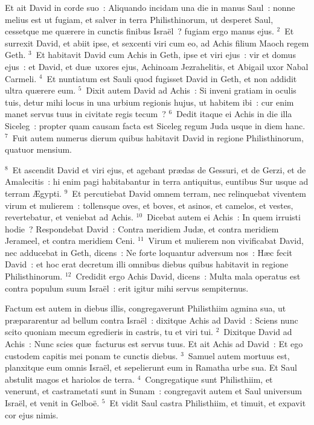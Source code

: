 \lettrine[lines=10,image=true,loversize=0.05,lraise=-0.03]{E}{}t ait David in corde suo~: Aliquando incidam una die in manus Saul~: nonne melius est ut fugiam, et salver in terra Philisthinorum, ut desperet Saul, cessetque me qu\ae rere in cunctis finibus Isra\"el~? fugiam ergo manus ejus.
${}^{2}$~Et surrexit David, et abiit ipse, et sexcenti viri cum eo, ad Achis filium Maoch regem Geth.
${}^{3}$~Et habitavit David cum Achis in Geth, ipse et viri ejus~: vir et domus ejus~: et David, et du\ae\ uxores ejus, Achinoam Jezrahelitis, et Abigail uxor Nabal Carmeli.
${}^{4}$~Et nuntiatum est Sauli quod fugisset David in Geth, et non addidit ultra qu\ae rere eum.
${}^{5}$~Dixit autem David ad Achis~: Si inveni gratiam in oculis tuis, detur mihi locus in una urbium regionis hujus, ut habitem ibi~: cur enim manet servus tuus in civitate regis tecum~?
${}^{6}$~Dedit itaque ei Achis in die illa Siceleg~: propter quam causam facta est Siceleg regum Juda usque in diem hanc.
${}^{7}$~Fuit autem numerus dierum quibus habitavit David in regione Philisthinorum, quatuor mensium.


${}^{8}$~Et ascendit David et viri ejus, et agebant pr\ae das de Gessuri, et de Gerzi, et de Amalecitis~: hi enim pagi habitabantur in terra antiquitus, euntibus Sur usque ad terram \AE gypti.
${}^{9}$~Et percutiebat David omnem terram, nec relinquebat viventem virum et mulierem~: tollensque oves, et boves, et asinos, et camelos, et vestes, revertebatur, et veniebat ad Achis.
${}^{10}$~Dicebat autem ei Achis~: In quem irruisti hodie~? Respondebat David~: Contra meridiem Jud\ae , et contra meridiem Jerameel, et contra meridiem Ceni.
${}^{11}$~Virum et mulierem non vivificabat David, nec adducebat in Geth, dicens~: Ne forte loquantur adversum nos~: H\ae c fecit David~: et hoc erat decretum illi omnibus diebus quibus habitavit in regione Philisthinorum.
${}^{12}$~Credidit ergo Achis David, dicens~: Multa mala operatus est contra populum suum Isra\"el~: erit igitur mihi servus sempiternus.

\lettrine[lines=10,image=true,loversize=0.05,lraise=-0.03]{F}{}actum est autem in diebus illis, congregaverunt Philisthiim agmina sua, ut pr\ae pararentur ad bellum contra Isra\"el~: dixitque Achis ad David~: Sciens nunc scito quoniam mecum egredieris in castris, tu et viri tui.
${}^{2}$~Dixitque David ad Achis~: Nunc scies qu\ae\ facturus est servus tuus. Et ait Achis ad David~: Et ego custodem capitis mei ponam te cunctis diebus.
${}^{3}$~Samuel autem mortuus est, planxitque eum omnis Isra\"el, et sepelierunt eum in Ramatha urbe sua. Et Saul abstulit magos et hariolos de terra.
${}^{4}$~Congregatique sunt Philisthiim, et venerunt, et castrametati sunt in Sunam~: congregavit autem et Saul universum Isra\"el, et venit in Gelbo\"e.
${}^{5}$~Et vidit Saul castra Philisthiim, et timuit, et expavit cor ejus nimis.


